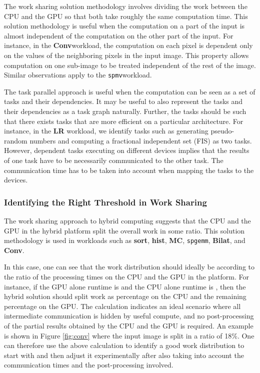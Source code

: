 \documentclass[11pt]{article}
\newcommand{\sgemm} {{\tt spgemm}}
\newcommand{\spmv} {{\tt spmv}}
\newcommand{\bilat} {{\bf Bilat}}
\newcommand{\conv} {{\bf Conv}}
\newcommand{\hist} {{\bf hist}}
\newcommand{\sort} {{\bf sort}}
\newcommand{\LR} {{\bf LR}}
\newcommand{\MC} {{\bf MC}}
\begin{document}
The work sharing solution methodology involves dividing the work between
the CPU and the GPU so that both take roughly the same computation time. 
This solution methodology is useful when the computation on a part of the
input is almost independent of the computation on the other part of the
input. For instance, in the \conv workload, the computation on each pixel
is dependent only on the values of the neighboring pixels in the input
image. This property allows computation on one sub-image to be treated
independent of the rest of the image. Similar observations apply to the
\spmv workload. 


The task parallel approach is useful when the computation can be seen as
a set of tasks and their dependencies. It may be useful to also
represent the tasks and their dependencies as a task graph naturally.
Further, the tasks should be such that there exists tasks that are more
efficient on a particular architecture. For instance, in the \LR
workload, we identify tasks such as generating pseudo-random numbers and
computing a fractional independent set (FIS) as two tasks. However,
dependent tasks executing on different devices implies that the results
of one task have to be necessarily communicated to the other task. The
communication time has to be taken into account when mapping the tasks
to the devices.

\subsubsection{Identifying the Right Threshold in Work Sharing} 
The work sharing approach to hybrid computing
suggests that the CPU and the GPU in the hybrid platform split the
overall work in some ratio. This solution methodology is used in
workloads such as \sort, \hist, \MC, \sgemm, \bilat, and \conv. 

In this case, one can see that the work
distribution should ideally be according to the ratio of the 
processing times on the CPU and the GPU in the platform. For instance, if the
GPU alone runtime is  and the CPU alone runtime is
, then the hybrid solution should split work as
 percentage on the CPU and the
remaining percentage on the GPU. The calculation indicates an ideal
scenario where all intermediate communication is hidden by useful
compute, and no post-processing of the partial results obtained by the
CPU and the GPU is required. An example is shown in Figure \ref{fig:conv}
where the input image is split in a ratio of 18\%.
One can therefore use the above calculation to identify a good work
distribution to start with and then 
adjust it experimentally after also taking into account the communication
times and the post-processing involved. 
\end{document}
